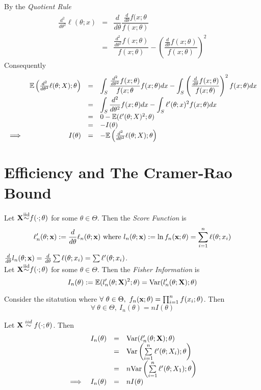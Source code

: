 \documentclass[11pt,a4paper]{article}
\begin{document}
By the \textit{Quotient Rule}
\[\begin{array}{rcl}
\frac{d^2}{d\theta^2}\ell(\theta;x)&=&\dfrac{d}{d\theta}\dfrac{\frac{d}{d\theta}f(x;\theta}{f(x;\theta)}\\
&=&\dfrac{\frac{d^2}{d\theta^2}f(x;\theta)}{f(x;\theta)}-\left(\dfrac{\frac{d}{d\theta}f(x;\theta)}{f(x;\theta)}\right)^2
\end{array}\]
Consequently
\[\begin{array}{rrcl}
&\mathbb{E}\left(\frac{d^2}{d\theta^2}\ell(\theta;X);\theta\right)&=&{\displaystyle\int_S\frac{\frac{d^2}{d\theta^2}f(x;\theta)}{f(x;\theta}f(x;\theta)dx-\int_S\left(\frac{\frac{d}{d\theta}f(x;\theta)}{f(x;\theta)}\right)^2f(x;\theta)dx}\\
&&=&{\displaystyle\int_S\frac{d^2}{d\theta^2}f(x;\theta)dx-\int_S\ell'(\theta;x)^2f(x;\theta)dx}\\
&&=&0-\mathbb{E}(\ell'(\theta;X)^2;\theta)\\
&&=&-I(\theta)\\
\implies&I(\theta)&=&-\mathbb{E}\left(\frac{d^2}{d\theta^2}\ell(\theta;X);\theta\right)
\end{array}\]
\proved

\section{Efficiency and The Cramer-Rao Bound}

Let $\textbf{X}{\overset{\text{iid}}{\sim}}f(\cdot;\theta)$ for some $\theta\in\Theta$. Then the \textit{Score Function} is
$$\ell'_n(\theta;\textbf{x}):=\frac{d}{d\theta}\ell_n(\theta;\textbf{x})\text{ where }l_n(\theta;\textbf{x}):=\ln f_n(\textbf{x};\theta)=\sum_{i=1}^n\ell(\theta;x_i)$$
\nb $\frac{d}{d\theta}l_n(\theta;\textbf{x})=\frac{d}{d\theta}\sum\ell(\theta;x_i)=\sum\ell'(\theta;x_i)$.\\

Let $\textbf{X}{\overset{\text{iid}}{\sim}}f(\cdot;\theta)$ for some $\theta\in\Theta$. Then the \textit{Fisher Information} is
$$I_n(\theta):=\mathbb{E}(l'_n(\theta;\textbf{X})^2;\theta)=\mathrm{Var}(l'_n(\theta;\textbf{X});\theta)$$

Consider the sitatution where $\forall\ \theta\in\Theta,\ f_n(\x;\theta)=\prod_{i=1}^nf(x_i;\theta)$. Then
$$\forall\ \theta\in\Theta,\ I_n(\theta)=nI(\theta)$$

Let $\textbf{X}\overset{iid}{\sim}f(\cdot;\theta)$. Then
\[\begin{array}{rrcl}
&I_n(\theta)&=&\mathrm{Var}(\ell'_n(\theta;\textbf{X});\theta)\\
&&=&\mathrm{Var}\left(\sum\limits_{i=1}^n\ell'(\theta;X_i);\theta\right)\\
&&=&n\mathrm{Var}\left(\sum\limits_{i=1}^n\ell'(\theta;X_1);\theta\right)\\
\implies&I_n(\theta)&=&nI(\theta)
\end{array}\]
\proved
\end{document}
